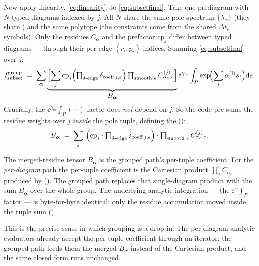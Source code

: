Now apply linearity, \eqref{eq:linearity}, to \eqref{eq:subsetfinal}. Take one
prediagram with $N$ typed diagrams indexed by $j$. All $N$ share the same pole
spectrum $\{\lambda_\alpha\}$ (they share ) and the same
polytope (the constraints come from the shared $\Delta t_e$ symbols). Only the
residues $C_\alpha$ and the prefactor $\mathrm{cp}_j$ differ between typed
diagrams --- through their per-edge $(r_i, p_i)$ indices. Summing
\eqref{eq:subsetfinal} over $j$:
\begin{equation}
  I_{\text{subset}}^{\text{group}}
  \;=\;
  \sum_{\bm\alpha}
  \underbrace{\Bigl[\sum_j \mathrm{cp}_j
    \Bigl(\textstyle\prod_{\delta\text{-edge}} \delta_{\mathrm{coeff}\,j,e}\Bigr)
    \prod_{\text{smooth }e} C^{(j)}_{\alpha_e,e}\Bigr]}_{\displaystyle B_{\bm\alpha}}
  \mathrm{e}^{\gamma_{\bm\alpha}}
  \int_P \exp\!\Bigl(\sum_i \alpha^{(i)}_s s_i\Bigr)\mathrm{d} s .
  \label{eq:merged}
\end{equation}
Crucially, the $\ee^{\gamma_{\bm\alpha}} \int_P(\cdots)$ factor does \emph{not}
depend on $j$. So the code pre-sums the residue weights over $j$ \emph{inside}
the pole tuple, defining the 
():
\begin{equation}
  B_{\bm\alpha}
  \;=\;
  \sum_j\ \Bigl(\mathrm{cp}_j \cdot
    \textstyle\prod_{\delta\text{-edge}} \delta_{\mathrm{coeff}\,j,e}\Bigr)
  \cdot \prod_{\text{smooth }e} C^{(j)}_{\alpha_e,e} .
  \label{eq:Bdef}
\end{equation}

\begin{defn}
The merged-residue tensor $B_{\bm\alpha}$ is the grouped path's per-tuple
coefficient. For the \emph{per-diagram} path the per-tuple coefficient is the
Cartesian product $\prod_e C_{\alpha_e}$ produced by 
(). The grouped path replaces that single-diagram
product with the sum $B_{\bm\alpha}$ over the whole group. The underlying analytic
integration --- the $\ee^\gamma \int_P$ factor --- is byte-for-byte identical; only
the residue accumulation moved inside the tuple sum
().
\end{defn}

This is the precise sense in which grouping is a drop-in. The per-diagram analytic
evaluators already accept the per-tuple coefficient through an iterator; the
grouped path feeds them the merged $B_{\bm\alpha}$ instead of the Cartesian
product, and the same closed form runs unchanged.

